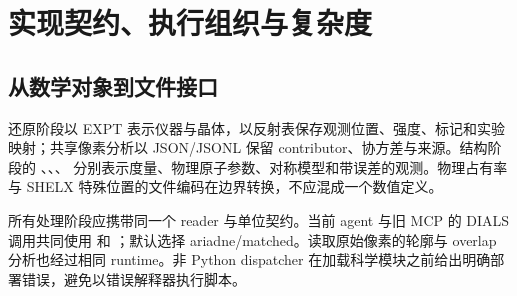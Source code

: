 \chapter{实现契约、执行组织与复杂度}
\section{从数学对象到文件接口}
还原阶段以 EXPT 表示仪器与晶体，以反射表保存观测位置、强度、标记和实验映射；共享像素分析以 JSON/JSONL 保留 contributor、协方差与来源。结构阶段的 、、、 分别表示度量、物理原子参数、对称模型和带误差的观测。物理占有率与 SHELX 特殊位置的文件编码在边界转换，不应混成一个数值定义。

所有处理阶段应携带同一个 reader 与单位契约。当前 agent 与旧 MCP 的 DIALS 调用共同使用  和 ；默认选择 ariadne/matched。读取原始像素的轮廓与 overlap 分析也经过相同 runtime。非 Python dispatcher 在加载科学模块之前给出明确部署错误，避免以错误解释器执行脚本。
